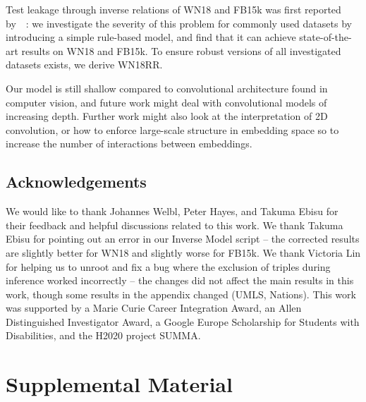 \documentclass[letterpaper]{article}
\newcommand{\citet}[1]{\citeauthor{#1}~\shortcite{#1}}
\begin{document}
Test leakage through inverse relations of WN18 and FB15k was first reported by~\citet{toutanova2015observed}: we investigate the severity of this problem for commonly used datasets by introducing a simple rule-based model, and find that it can achieve state-of-the-art results on WN18 and FB15k.
To ensure robust versions of all investigated datasets exists, we derive WN18RR.


Our model is still shallow compared to convolutional architecture found in computer vision, and future work might deal with convolutional models of increasing depth.
Further work might also look at the interpretation of 2D convolution, or how to enforce large-scale structure in embedding space so to increase the number of interactions between embeddings.

\subsection{Acknowledgements}

We would like to thank Johannes Welbl, Peter Hayes, and Takuma Ebisu for their feedback and helpful discussions related to this work. We thank Takuma Ebisu for pointing out an error in our Inverse Model script -- the corrected results are slightly better for WN18 and slightly worse for FB15k. We thank Victoria Lin for helping us to unroot and fix a bug where the exclusion of triples during inference worked incorrectly -- the changes did not affect the main results in this work, though some results in the appendix changed (UMLS, Nations).
This work was supported by a Marie Curie Career Integration Award, an Allen Distinguished Investigator Award, a Google Europe Scholarship for Students with Disabilities, and the H2020 project SUMMA. 




\appendix


\section{\LARGE {\sc Supplemental Material}}

\newcommand{\Test}{\ensuremath{\mathcal{T}}}

\newcommand{\corr}[1]{\ensuremath{\mathcal{C}(#1)}}
\newcommand{\scorr}[1]{\ensuremath{\mathcal{C}^{\text{s}}(#1)}}
\newcommand{\ocorr}[1]{\ensuremath{\mathcal{C}^{\text{o}}(#1)}}

\newcommand{\KG}{\ensuremath{\mathcal{G}}}
\newcommand{\ff}{\ensuremath{f}}
\newcommand{\card}[1]{\ensuremath{\left\vert{#1}\right\vert}}
\newcommand{\Rank}{\text{rank}}
\newcommand{\cN}{\ensuremath{\mathcal{N}}}
\newcommand{\scdot}{\ensuremath{{}\cdot{}}}
\end{document}

